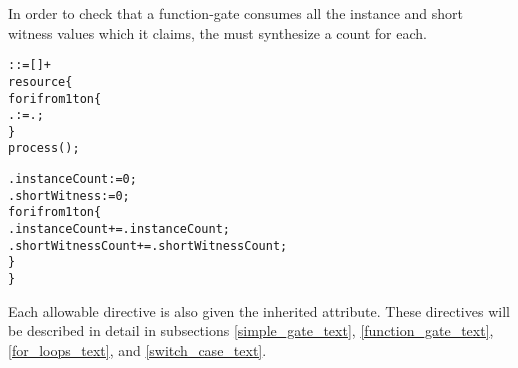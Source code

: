 In order to check that a function-gate consumes all the instance and short witness values which it claims, the  must synthesize a count for each.\\

\begin{alltt}\ttSyn
   ::= [  ]+ \ttSem
  resource \{
    for i from 1 to n \{
      . := .;
    \}
    process();
    
    .instanceCount := 0;
    .shortWitness := 0;
    for i from 1 to n \{
      .instanceCount += .instanceCount;
      .shortWitnessCount += .shortWitnessCount;
    \}
  \}
\end{alltt}

Each allowable directive is also given the inherited  attribute.
These directives will be described in detail in subsections \ref{simple_gate_text}, \ref{function_gate_text}, \ref{for_loops_text}, and \ref{switch_case_text}.\\

